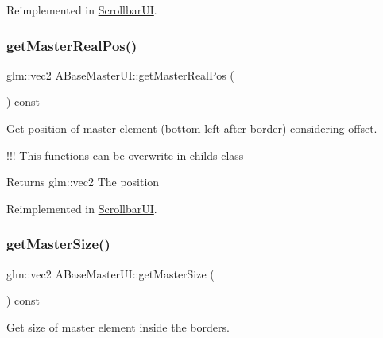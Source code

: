 Reimplemented in \hyperlink{class_scrollbar_u_i_a3a4c39a263f6bf7783b1054f57a26ee7}{Scrollbar\+UI}.

\mbox{\label{class_a_base_master_u_i_a64cf45d76b377fd59ec19f1f1d53c0be}} 
\subsubsection{\texorpdfstring{get\+Master\+Real\+Pos()}{getMasterRealPos()}}
{\footnotesize\ttfamily glm\+::vec2 A\+Base\+Master\+U\+I\+::get\+Master\+Real\+Pos (\begin{DoxyParamCaption}{ }\end{DoxyParamCaption}) const\hspace{0.3cm}{\ttfamily [virtual]}}



Get position of master element (bottom left after border) considering offset. 

!!! This functions can be overwrite in childs class

\begin{DoxyReturn}{Returns}
glm\+::vec2 The position 
\end{DoxyReturn}


Reimplemented in \hyperlink{class_scrollbar_u_i_a7dd8afe939f8b8a5f9486eeec1f56d92}{Scrollbar\+UI}.

\mbox{\label{class_a_base_master_u_i_ad8e2ca2b3f67ca274e5dd0169e454e55}} 
\subsubsection{\texorpdfstring{get\+Master\+Size()}{getMasterSize()}}
{\footnotesize\ttfamily glm\+::vec2 A\+Base\+Master\+U\+I\+::get\+Master\+Size (\begin{DoxyParamCaption}{ }\end{DoxyParamCaption}) const\hspace{0.3cm}{\ttfamily [virtual]}}



Get size of master element inside the borders. 

